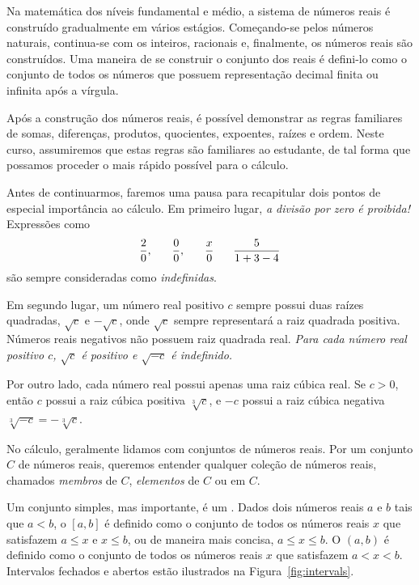 Na matemática dos níveis fundamental e médio, a sistema de números
reais é construído gradualmente em vários estágios. Começando-se
pelos números naturais, continua-se com os inteiros,
racionais e, finalmente, os números reais são construídos. Uma
maneira de se construir o conjunto dos reais é defini-lo
como o conjunto de todos os números que possuem representação
decimal finita ou infinita após a vírgula.

Após a construção dos números reais, é possível demonstrar as
regras familiares de somas, diferenças, produtos, quocientes,
expoentes, raízes e ordem. Neste curso, assumiremos que estas
regras são familiares ao estudante, de tal forma que possamos
proceder o mais rápido possível para o cálculo.

Antes de continuarmos, faremos uma pausa para recapitular dois
pontos de especial importância ao cálculo. Em primeiro lugar,
\emph{a divisão por zero é proibida!} Expressões como
\[
\frac{2}{0}, \hspace{4ex} \frac{0}{0}, \hspace{4ex} 
\frac{x}{0} \hspace{4ex} \frac{5}{1+3-4}
\]
são sempre consideradas como \emph{indefinidas}.

Em segundo lugar, um número real positivo $c$ sempre possui duas
raízes quadradas, $\sqrt{c}$ e $-\sqrt{c}$, onde $\sqrt{c}$ sempre
representará a raiz quadrada positiva. Números reais negativos não
possuem raiz quadrada real. \emph{Para cada número real positivo
$c$, $\sqrt{c}$ é positivo e $\sqrt{-c}$ é indefinido.}

Por outro lado, cada número real possui apenas uma raiz cúbica real.
Se $c > 0$, então $c$ possui a raiz cúbica positiva $\sqrt[3]{c}$, e $-c$
possui a raiz cúbica negativa $\sqrt[3]{-c} = -\sqrt[3]{c}$.

No cálculo, geralmente lidamos com conjuntos de números reais. Por um
conjunto $C$ de números reais, queremos entender qualquer coleção de
números reais, chamados \emph{membros} de $C$, \emph{elementos} de $C$
ou  em $C$.

Um conjunto simples, mas importante, é um . Dados dois
números reais $a$ e $b$ tais que $a < b$, o
$[a,b]$ é definido como o conjunto de todos os números reais $x$
que satisfazem $a \le x$ e $x \le b$, ou de maneira mais concisa,
$a \le x \le b$.
O  $(a,b)$ é definido como o conjunto de todos
os números reais $x$ que satisfazem $a < x < b$. Intervalos fechados e
abertos estão ilustrados na Figura~\ref{fig:intervals}. 

